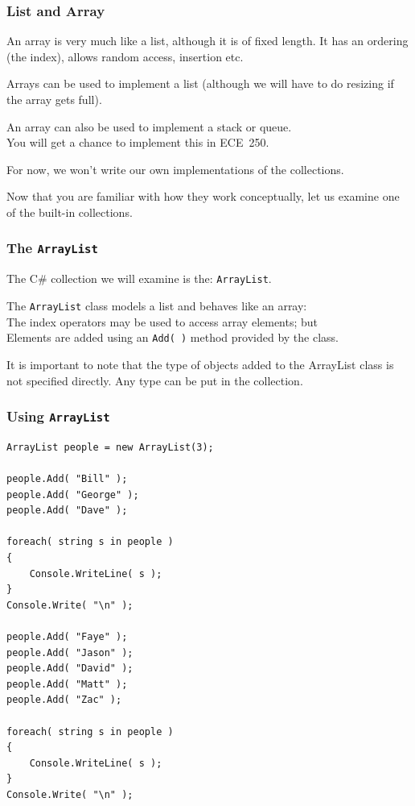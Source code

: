 \begin{frame}
\frametitle{List and Array}
An array is very much like a list, although it is of fixed length. It has an ordering (the index), allows random access, insertion etc.

Arrays can be used to implement a list (although we will have to do resizing if the array gets full).

An array can also be used to implement a stack or queue.\\
\quad You will get a chance to implement this in ECE~250.

For now, we won't write our own implementations of the collections.

Now that you are familiar with how they work conceptually, let us examine one of the built-in collections.

\end{frame}


\begin{frame}
\frametitle{The \texttt{ArrayList}}

The C\# collection we will examine is the: \texttt{ArrayList}.

The \texttt{ArrayList} class models a list and behaves like an array:\\
\quad The index operators may be used to access array elements; but \\
\quad Elements are added using an \texttt{Add( )} method provided by the class.

It is important to note that the type of objects added to the ArrayList class is not specified directly. Any type can be put in the collection.
\end{frame}

\begin{frame}[fragile]
\frametitle{Using \texttt{ArrayList}}
{\scriptsize
\begin{verbatim}
ArrayList people = new ArrayList(3);
		
people.Add( "Bill" );
people.Add( "George" );
people.Add( "Dave" );

foreach( string s in people )
{
    Console.WriteLine( s );
}
Console.Write( "\n" );

people.Add( "Faye" );
people.Add( "Jason" );
people.Add( "David" );
people.Add( "Matt" );
people.Add( "Zac" );

foreach( string s in people )
{
    Console.WriteLine( s );
}
Console.Write( "\n" );
\end{verbatim}
}
\end{frame}


